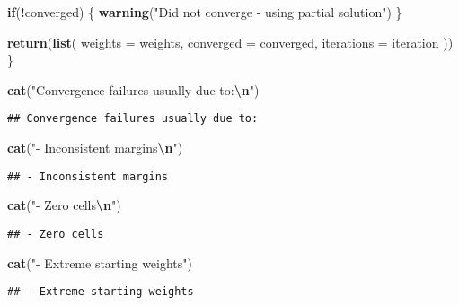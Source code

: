 \documentclass[
]{article}
\newenvironment{Shaded}{\begin{snugshade}}{\end{snugshade}}
\newcommand{\AttributeTok}[1]{\textcolor[rgb]{0.13,0.29,0.53}{#1}}
\newcommand{\ControlFlowTok}[1]{\textcolor[rgb]{0.13,0.29,0.53}{\textbf{#1}}}
\newcommand{\FunctionTok}[1]{\textcolor[rgb]{0.13,0.29,0.53}{\textbf{#1}}}
\newcommand{\NormalTok}[1]{#1}
\newcommand{\SpecialCharTok}[1]{\textcolor[rgb]{0.81,0.36,0.00}{\textbf{#1}}}
\newcommand{\StringTok}[1]{\textcolor[rgb]{0.31,0.60,0.02}{#1}}
\begin{document}
\begin{Shaded}
\begin{Highlighting}[]
  \ControlFlowTok{if}\NormalTok{(}\SpecialCharTok{!}\NormalTok{converged) \{}
    \FunctionTok{warning}\NormalTok{(}\StringTok{"Did not converge {-} using partial solution"}\NormalTok{)}
\NormalTok{  \}}
  
  \FunctionTok{return}\NormalTok{(}\FunctionTok{list}\NormalTok{(}
    \AttributeTok{weights =}\NormalTok{ weights,}
    \AttributeTok{converged =}\NormalTok{ converged,}
    \AttributeTok{iterations =}\NormalTok{ iteration}
\NormalTok{  ))}
\NormalTok{\}}

\FunctionTok{cat}\NormalTok{(}\StringTok{"Convergence failures usually due to:}\SpecialCharTok{\textbackslash{}n}\StringTok{"}\NormalTok{)}
\end{Highlighting}
\end{Shaded}

\begin{verbatim}
## Convergence failures usually due to:
\end{verbatim}

\begin{Shaded}
\begin{Highlighting}[]
\FunctionTok{cat}\NormalTok{(}\StringTok{"{-} Inconsistent margins}\SpecialCharTok{\textbackslash{}n}\StringTok{"}\NormalTok{)}
\end{Highlighting}
\end{Shaded}

\begin{verbatim}
## - Inconsistent margins
\end{verbatim}

\begin{Shaded}
\begin{Highlighting}[]
\FunctionTok{cat}\NormalTok{(}\StringTok{"{-} Zero cells}\SpecialCharTok{\textbackslash{}n}\StringTok{"}\NormalTok{)}
\end{Highlighting}
\end{Shaded}

\begin{verbatim}
## - Zero cells
\end{verbatim}

\begin{Shaded}
\begin{Highlighting}[]
\FunctionTok{cat}\NormalTok{(}\StringTok{"{-} Extreme starting weights"}\NormalTok{)}
\end{Highlighting}
\end{Shaded}

\begin{verbatim}
## - Extreme starting weights
\end{verbatim}
\end{document}
